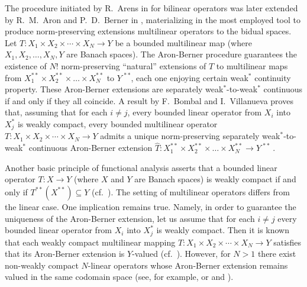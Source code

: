 \documentclass[10pt]{amsart}
\begin{document}
	The procedure initiated by R.~Arens in \cite{Ar} for bilinear operators was later extended by R.~M.~Aron and P.~D.~Berner in \cite{ArBer78}, materializing in the most employed tool to produce norm-preserving extensions multilinear operators to the bidual spaces. Let $T\colon X_{1}\times X_{2}\times \cdots \times X_{N}\longrightarrow Y$ be a bounded multilinear map (where $X_{1},X_{2}, \ldots, X_{N},Y$ are Banach
	spaces). The Aron-Berner procedure guarantees the existence of $N!$ norm-preserving ``natural'' extensions of $T$ to multilinear maps from $X_{1}^{\ast \ast }\times X_{2}^{\ast \ast }\times \ldots \times X_{N}^{\ast \ast }$ to $Y^{\,\ast \ast }$, each one enjoying certain weak$^*$ continuity property. These Aron-Berner extensions are separately weak$^*$-to-weak$^*$ continuous if and only if they all coincide. A result by F.~Bombal and I.~Villanueva proves that, assuming that for each $i \neq j$, every bounded linear operator from $X_i$ into $X^*_j$ is weakly compact, every bounded multilinear operator $T\colon X_{1}\times X_{2}\times \cdots \times X_{N}\longrightarrow Y$ admits a unique norm-preserving separately weak$^*$-to-weak$^*$ continuous Aron-Berner extension $\widehat{T}\colon X_{1}^{\ast \ast }\times X_{2}^{\ast \ast }\times \ldots \times X_{N}^{\ast \ast } \longrightarrow Y^{\,\ast \ast }$ \cite[Theorem 1]{BomVi}.
	
	Another basic principle of functional analysis asserts that a bounded linear operator $T\colon X\longrightarrow Y$ (where $X$ and $Y$ are Banach spaces) is weakly compact if and only if $T^{**} (X^{**})\subseteq Y$ (cf.\ \cite[Theorem 5.5]{ConwayBook}). The setting of multilinear operators differs from the linear case. One implication remains true. Namely, in order to guarantee the uniqueness of the Aron-Berner extension, let us assume that for each $i \neq j$ every bounded linear operator from $X_i$ into $X^*_j$ is weakly compact. Then it is known that each weakly compact multilinear mapping $T\colon X_{1}\times X_{2}\times \cdots \times X_{N}\longrightarrow Y$ satisfies that its Aron-Berner extension is $Y$-valued  (cf.\ \cite[Corollary 2]{BomVi}). However, for $N>1$ there exist non-weakly compact $N$-linear operators whose Aron-Berner extension remains valued in the same codomain space (see, for example, \cite[page 385]{Pelc63} or \cite[Lemma 7]{GonGu95} and \cite[Theorem 5]{Vi}).
	
\end{document}
